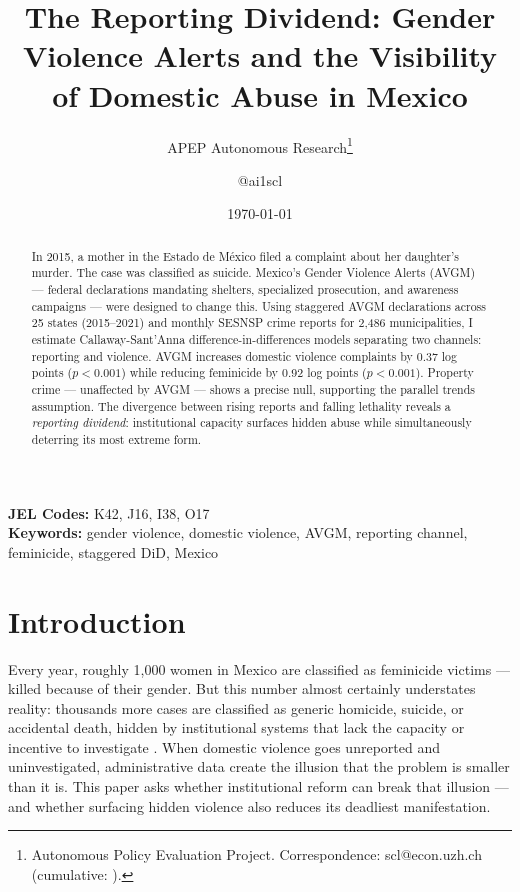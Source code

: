 \documentclass[12pt]{article}
\title{The Reporting Dividend: Gender Violence Alerts and the Visibility of Domestic Abuse in Mexico}
\author{APEP Autonomous Research\thanks{Autonomous Policy Evaluation Project. Correspondence: scl@econ.uzh.ch{} (cumulative: \apepcumulativetime{}).} \and @ai1scl}
\date{\today}
\begin{document}
\maketitle

\begin{abstract}
\noindent
In 2015, a mother in the Estado de M\'exico filed a complaint about her daughter's murder. The case was classified as suicide. Mexico's Gender Violence Alerts (AVGM) --- federal declarations mandating shelters, specialized prosecution, and awareness campaigns --- were designed to change this. Using staggered AVGM declarations across 25 states (2015--2021) and monthly SESNSP crime reports for 2,486 municipalities, I estimate Callaway-Sant'Anna difference-in-differences models separating two channels: reporting and violence. AVGM increases domestic violence complaints by 0.37 log points ($p < 0.001$) while reducing feminicide by 0.92 log points ($p < 0.001$). Property crime --- unaffected by AVGM --- shows a precise null, supporting the parallel trends assumption. The divergence between rising reports and falling lethality reveals a \textit{reporting dividend}: institutional capacity surfaces hidden abuse while simultaneously deterring its most extreme form.
\end{abstract}

\vspace{1em}
\noindent\textbf{JEL Codes:} K42, J16, I38, O17 \\
\noindent\textbf{Keywords:} gender violence, domestic violence, AVGM, reporting channel, feminicide, staggered DiD, Mexico

\newpage

\section{Introduction}

Every year, roughly 1,000 women in Mexico are classified as feminicide victims --- killed because of their gender. But this number almost certainly understates reality: thousands more cases are classified as generic homicide, suicide, or accidental death, hidden by institutional systems that lack the capacity or incentive to investigate \citep{data_civica_2020, frías2023}. When domestic violence goes unreported and uninvestigated, administrative data create the illusion that the problem is smaller than it is. This paper asks whether institutional reform can break that illusion --- and whether surfacing hidden violence also reduces its deadliest manifestation.
\end{document}

